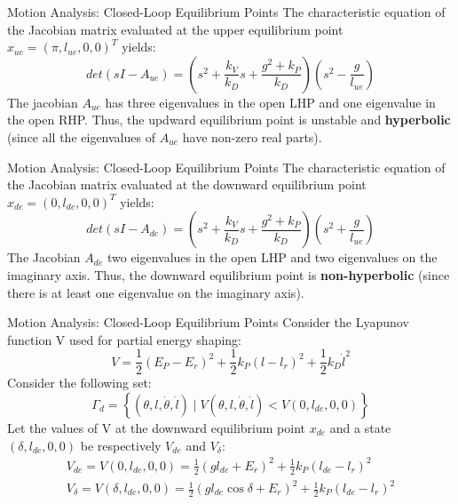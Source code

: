 \documentclass[10pt]{beamer}
\begin{document}
	\begin{frame}{Motion Analysis: Closed-Loop Equilibrium Points}
		The characteristic equation of the Jacobian matrix evaluated
    at the upper equilibrium point $x_{ue} = (\pi, l_{ue}, 0, 0)^T$
    yields:
    \begin{equation*}
      det(sI-A_{ue}) = \left( s^2 + \frac{k_V}{k_D}s +
        \frac{g^2+k_P}{k_D} \right) \left( s^2 - \frac{g}{l_{ue}}\right)
    \end{equation*}
		The jacobian $A_{ue}$ has three eigenvalues in the open LHP and
    one eigenvalue in the open RHP. Thus, the updward equilibrium point
    is unstable and \textbf{hyperbolic} (since all the eigenvalues of $A_{ue}$
    have non-zero real parts).
	\end{frame}

	\begin{frame}{Motion Analysis: Closed-Loop Equilibrium Points}
		The characteristic equation of the Jacobian matrix evaluated
    at the downward equilibrium point $x_{de} = (0, l_{de}, 0, 0)^T$ yields:
    \begin{equation*}
      det(sI-A_{de}) = \left( s^2 + \frac{k_V}{k_D}s +
        \frac{g^2+k_P}{k_D} \right) \left( s^2 + \frac{g}{l_{ue}}\right)
    \end{equation*}
		The Jacobian $A_{de}$ two eigenvalues in the open LHP and two
    eigenvalues on the imaginary axis. Thus, the downward equilibrium
		point is \textbf{non-hyperbolic} (since there
    is at least one eigenvalue on the imaginary axis).
	\end{frame}

	\begin{frame}{Motion Analysis: Closed-Loop Equilibrium Points}
		Consider the Lyapunov function V used for partial energy shaping:
    \begin{equation*}
			V = \frac{1}{2}(E_P-E_r)^2+\frac{1}{2}k_P(l-l_r)^2+
      	\frac{1}{2}k_D\dot{l}^2
    \end{equation*}
		Consider the following set:
    \begin{equation*}
      \Gamma_d = \left\{ (\theta, l, \dot{\theta}, \dot{l})
        \mid V(\theta, l, \dot{\theta}, \dot{l}) <
        V(0, l_{de}, 0, 0) \right\}
    \end{equation*}
		Let the values of V at the downward equilibrium point $x_{de}$
    and a state $(\delta, l_{de}, 0, 0)$ be respectively $V_{de}$
    and $V_\delta$:
    \begin{gather*}
      V_{de} = V(0, l_{de}, 0, 0) = \frac{1}{2}(g l_{de} + E_r)^2
        + \frac{1}{2} k_P (l_{de} - l_r)^2 \\
      V_\delta = V(\delta, l_{de}, 0, 0) = \frac{1}{2}(g l_{de}
        \cos\delta + E_r)^2 + \frac{1}{2} k_P (l_{de} - l_r)^2
    \end{gather*}
	\end{frame}
\end{document}
